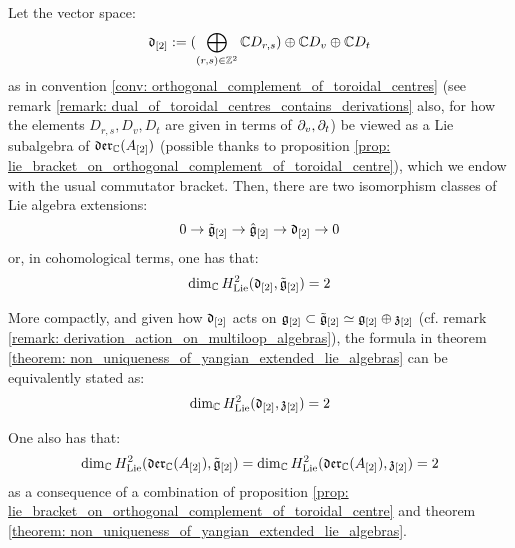         \begin{theorem} \label{theorem: non_uniqueness_of_yangian_extended_lie_algebras}
            Let the vector space:
                $$\mathfrak{d}_{[2]} := (\bigoplus_{(r, s) \in \mathbb{Z}^2} \mathbb{C} D_{r, s}) \oplus \mathbb{C} D_v \oplus \mathbb{C} D_t$$
            as in convention \ref{conv: orthogonal_complement_of_toroidal_centres} (see remark \ref{remark: dual_of_toroidal_centres_contains_derivations} also, for how the elements $D_{r, s}, D_v, D_t$ are given in terms of $\partial_v, \partial_t$) be viewed as a Lie subalgebra of $\mathfrak{der}_{\mathbb{C}}(A_{[2]})$ (possible thanks to proposition \ref{prop: lie_bracket_on_orthogonal_complement_of_toroidal_centre}), which we endow with the usual commutator bracket. Then, there are two isomorphism classes of Lie algebra extensions:
                $$0 \to \tilde{\mathfrak{g}}_{[2]} \to \hat{\mathfrak{g}}_{[2]} \to \mathfrak{d}_{[2]} \to 0$$
            or, in cohomological terms, one has that:
                $$\dim_{\mathbb{C}} H^2_{\mathrm{Lie}}(\mathfrak{d}_{[2]}, \tilde{\mathfrak{g}}_{[2]}) = 2$$
        \end{theorem}
        \begin{corollary}
            More compactly, and given how $\mathfrak{d}_{[2]}$ acts on $\mathfrak{g}_{[2]} \subset \tilde{\mathfrak{g}}_{[2]} \simeq \mathfrak{g}_{[2]} \oplus \mathfrak{z}_{[2]}$ (cf. remark \ref{remark: derivation_action_on_multiloop_algebras}), the formula in theorem \ref{theorem: non_uniqueness_of_yangian_extended_lie_algebras} can be equivalently stated as:
                $$\dim_{\mathbb{C}} H^2_{\mathrm{Lie}}(\mathfrak{d}_{[2]}, \mathfrak{z}_{[2]}) = 2$$
        \end{corollary}
        \begin{corollary}
            One also has that:
                $$\dim_{\mathbb{C}} H^2_{\mathrm{Lie}}(\mathfrak{der}_{\mathbb{C}}(A_{[2]}), \tilde{\mathfrak{g}}_{[2]}) = \dim_{\mathbb{C}} H^2_{\mathrm{Lie}}(\mathfrak{der}_{\mathbb{C}}(A_{[2]}), \mathfrak{z}_{[2]}) = 2$$
            as a consequence of a combination of proposition \ref{prop: lie_bracket_on_orthogonal_complement_of_toroidal_centre} and theorem \ref{theorem: non_uniqueness_of_yangian_extended_lie_algebras}.
        \end{corollary}

